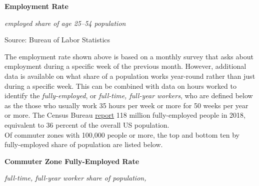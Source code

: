 \documentclass{report}
\makeatletter
\newcommand{\tbllink}[1]{\href{https://raw.githubusercontent.com/bdecon/US-chartbook/master/chartbook/data/#1}{\faTable}}
\newcommand*\short[1]{\expandafter\@gobbletwo\number\numexpr#1\relax}
\newcommand{\dateaxisticks}{
		date coordinates in=x, axis line style={draw=none},
		xmax={2020-10-01},
		max space between ticks=40,	    
		xtick={{1990-01-01}, {1992-01-01}, {1994-01-01}, 
			{1996-01-01}, {1998-01-01}, {2000-01-01}, 
			{2002-01-01}, {2004-01-01}, {2006-01-01},
			{2008-01-01}, {2010-01-01}, {2012-01-01}, {2014-01-01},
		    {2016-01-01}, {2018-01-01}, {2020-01-01}},
		minor xtick={{1989-01-01}, {1991-01-01}, {1993-01-01},
			{1995-01-01}, {1997-01-01}, {1999-01-01}, 
			{2001-01-01}, {2003-01-01}, {2005-01-01}, {2007-01-01},
		    {2009-01-01}, {2011-01-01}, {2013-01-01}, {2015-01-01},
		    {2017-01-01}, {2019-01-01}},
		enlarge y limits={0.06}, enlarge x limits={0.01},
		}
\newcommand{\bbar}[2]{extra #1 ticks = {{#2}}, extra #1 tick labels = ,
		extra #1 tick style = {grid=major, grid style={thick, black!25}},}
\newcommand{\stdline}[4]{\addplot[very thick, no markers, color=#1] 
		table [x=#2, y=#3, col sep=comma] {#4};	}
\newcommand{\rbars}{
		\fill[color=black!10] (axis cs:{1990-07-01},\pgfkeysvalueof{/pgfplots/ymin}) rectangle 
			(axis cs:{1991-03-01}, \pgfkeysvalueof{/pgfplots/ymax});
		\fill[color=black!10] (axis cs:{2007-12-01},\pgfkeysvalueof{/pgfplots/ymin}) rectangle 
			(axis cs:{2009-07-01}, \pgfkeysvalueof{/pgfplots/ymax});
		\fill[color=black!10] (axis cs:{2001-03-01},\pgfkeysvalueof{/pgfplots/ymin}) rectangle 
			(axis cs:{2001-11-01}, \pgfkeysvalueof{/pgfplots/ymax});
		\fill[color=black!10] (axis cs:{2020-02-01},\pgfkeysvalueof{/pgfplots/ymin}) rectangle 
			(axis cs:{2020-10-01}, \pgfkeysvalueof{/pgfplots/ymax});}
\makeatother
\begin{document}
{{{{{{\begin{minipage}{0.76\textwidth}
\vspace{2mm}

\normalsize \textbf{Employment Rate}

\footnotesize{\textit{employed share of age 25--54 population}}

\hspace*{-2mm} 

\footnotesize{Source: Bureau of Labor Statistics} \hfill \tbllink{epop.csv}

\vspace{6mm}

\small The employment rate shown above is based on a monthly survey that asks about employment during a specific week of the previous month. However, additional data is available on what share of a population works year-round rather than just during a specific week. This can be combined with data on hours worked to identify the \textit{fully-employed}, or \textit{full-time, full-year workers}, who are defined below as the those who usually work 35 hours per week or more for 50 weeks per year or more. The Census Bureau \href{https://www.census.gov/data/tables/time-series/demo/income-poverty/cps-pinc/pinc-01.html#par_textimage_14}{report} 118 million fully-employed people in 2018, equivalent to 36 percent of the overall US population. \\

 Of commuter zones with 100,000 people or more, the top and bottom ten by fully-employed share of population are listed below.
\end{minipage}

\vspace{3mm}

\begin{minipage}{0.52\textwidth}

\normalsize \textbf{Commuter Zone Fully-Employed Rate}

\footnotesize{\textit{full-time, full-year worker share of population, }}

\vspace{1mm}


\end{minipage}}}}}}}
\end{document}
